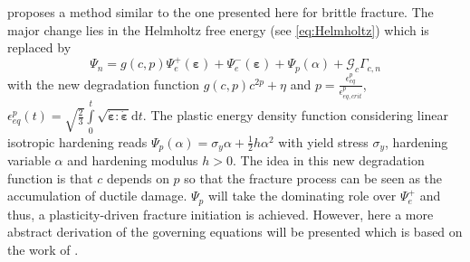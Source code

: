 \begin{table}
\begin{center}
\begin{tabular}{|c||c|c|c|}
		\hline
	\end{tabular}
	\end{center}
 \label{fig:plastic}
\end{table}

\citet{06_PF_ductile} proposes a method similar to the one presented here for brittle fracture. The major change lies in the Helmholtz free energy (see \eqref{eq:Helmholtz}) which is replaced by
\begin{equation} \label{eq:Helmholtz_ductile1}
	\Psi_{n} = g\left(c,p\right)\Psi_{e}^{+}\left(\bm{\varepsilon}\right)+\Psi_{e}^{-}\left(\bm{\varepsilon}\right)+\Psi_{p}\left(\alpha\right)+\mathcal{G}_{c}\Gamma_{c,n}
\end{equation}
with the new degradation function $g\left(c,p\right)c^{2p}+\eta$ and $p=\frac{\epsilon_{eq}^{p}}{\epsilon_{eq,crit}^{p}}$, $\epsilon_{eq}^{p}\left(t\right)=\sqrt{\frac{2}{3}}\int\limits_{0}^{t}\sqrt{\dot{\bm{\varepsilon}}:\dot{\bm{\varepsilon}}}\mathrm{d}t$. The plastic energy density function considering linear isotropic hardening reads $\Psi_{p}\left(\alpha\right)=\sigma_{y}\alpha+\frac{1}{2}h\alpha^{2}$ with yield stress $\sigma_{y}$, hardening variable $\alpha$ and hardening modulus $h>0$. The idea in this new degradation function is that $c$ depends on $p$ so that the fracture process can be seen as the accumulation of ductile damage. $\Psi_{p}$ will take the dominating role over $\Psi_{e}^{+}$ and thus, a plasticity-driven fracture initiation is achieved. However, here a more abstract derivation of the governing equations will be presented which is based on the work of \citet{03_PF_ductile}.

